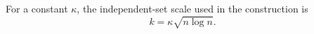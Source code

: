 \begin{definition}
For a constant \(\kappa\), the independent-set scale used in the construction is
\[
k=\kappa\sqrt{n\log n}.
\]
\end{definition}
